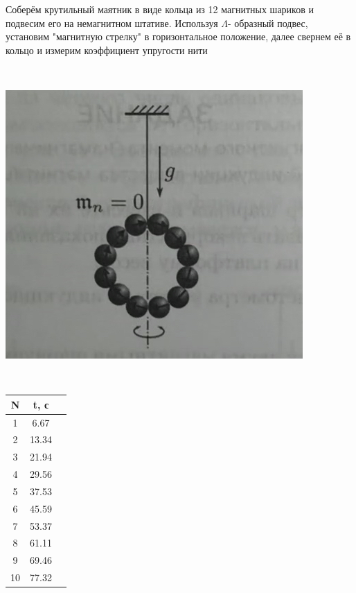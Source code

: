 \begin{minipage}{0.3\textwidth}
Соберём крутильный маятник в виде кольца из 12 магнитных шариков и подвесим его на немагнитном штативе. Используя $\Lambda$- образный подвес, установим "магнитную стрелку" в горизонтальное положение, далее свернем её в кольцо и измерим коэффициент упругости нити

\end{minipage}
\begin{minipage}{0.05\textwidth}
\
\end{minipage}
\begin{minipage}{0.3\textwidth}
\begin{center}
\includegraphics[width=\linewidth]{5.jpg}\\
\end{center}

\end{minipage}
\begin{minipage}{0.1\textwidth}
\
\end{minipage}
\begin{minipage}{0.3\textwidth}
\begin{tabular}{|c|c|c|}
		\hline
		N    & t, с  \\ 
		\hline
1   & 6.67 \\ 
		\hline
2     &13.34 \\ 
		\hline
 3     &  21.94 \\ 
		\hline
4     &  29.56\\ 
		\hline
 5     & 37.53 \\ 
		\hline
6     & 45.59 \\ 
		\hline
7     &  53.37\\ 
		\hline
8     & 61.11 \\ 
		\hline
9     &69.46 \\ 
		\hline
 10   & 77.32 \\ 
		\hline
	\end{tabular}

\end{minipage}
\\


